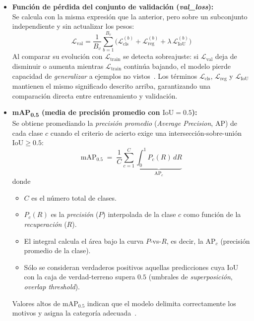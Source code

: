 \begin{itemize}
    \item \textbf{Función de pérdida del conjunto de validación (\emph{val\_loss}):}\\[2pt]
      Se calcula con la misma expresión que la anterior, pero sobre un subconjunto independiente y sin actualizar los pesos:
      \[
      \mathcal{L}_{\text{val}}
      =\frac{1}{B_v}\sum_{b=1}^{B_v}
        \bigl(
          \mathcal{L}_{\text{cls}}^{(b)}
          +\mathcal{L}_{\text{reg}}^{(b)}
          +\lambda\,\mathcal{L}_{\text{IoU}}^{(b)}
        \bigr)
      \]
      Al comparar su evolución con $\mathcal{L}_{\text{train}}$ se detecta sobreajuste: si $\mathcal{L}_{\text{val}}$ deja de disminuir o aumenta mientras $\mathcal{L}_{\text{train}}$ continúa bajando, el modelo pierde capacidad de \emph{generalizar} a ejemplos no vistos~\cite{goodfellow2016deep}.
      Los términos $\mathcal{L}_{\text{cls}}$, $\mathcal{L}_{\text{reg}}$ y $\mathcal{L}_{\text{IoU}}$ mantienen el mismo significado descrito arriba, garantizando una comparación directa entre entrenamiento y validación.

    \item \textbf{mAP\textsubscript{0.5} (media de precisión promedio con $\text{IoU}=0.5$):}\\[2pt]
      Se obtiene promediando la \emph{precisión promedio} (\textit{Average Precision}, $\mathrm{AP}$) de cada clase $c$ cuando el criterio de acierto exige una intersección-sobre-unión $\text{IoU}\ge 0.5$:
      \[
      \text{mAP}_{0.5}
      \;=\;
      \frac{1}{C}\sum_{c=1}^{C}
      \underbrace{\int_{0}^{1} P_c(R)\,dR}_{\mathrm{AP}_c}
      \]
      donde
      \begin{itemize}
        \item $C$ es el número total de clases.
        \item $P_c(R)$ es la \textit{precisión} ($P$) interpolada de la clase $c$ como función de la \textit{recuperación} ($R$).
        \item El integral calcula el área bajo la curva $P$-vs-$R$, es decir, la $\mathrm{AP}_c$ (precisión promedio de la clase).
        \item Sólo se consideran verdaderos positivos aquellas predicciones cuya $\text{IoU}$ con la caja de verdad-terreno supera $0.5$ (umbrales de \textit{superposición}, \emph{overlap threshold}).
      \end{itemize}
      Valores altos de $\text{mAP}_{0.5}$ indican que el modelo delimita correctamente los motivos y asigna la categoría adecuada~\cite{lin2014microsoft,everingham2010pascal}.


\end{itemize}
